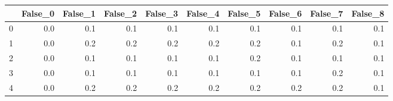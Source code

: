 \begin{tabular}{lrrrrrrrrr}
\toprule
{} &  False\_0 &  False\_1 &  False\_2 &  False\_3 &  False\_4 &  False\_5 &  False\_6 &  False\_7 &  False\_8 \\ \hline
\midrule
0 &      0.0 &      0.1 &      0.1 &      0.1 &      0.1 &      0.1 &      0.1 &      0.1 &      0.1 \\ \hline
1 &      0.0 &      0.2 &      0.2 &      0.2 &      0.2 &      0.2 &      0.1 &      0.2 &      0.1 \\ \hline
2 &      0.0 &      0.1 &      0.1 &      0.1 &      0.1 &      0.2 &      0.1 &      0.1 &      0.1 \\ \hline
3 &      0.0 &      0.1 &      0.1 &      0.1 &      0.1 &      0.1 &      0.1 &      0.2 &      0.1 \\ \hline
4 &      0.0 &      0.2 &      0.2 &      0.2 &      0.2 &      0.2 &      0.2 &      0.2 &      0.1 \\ \hline
\bottomrule
\end{tabular}
